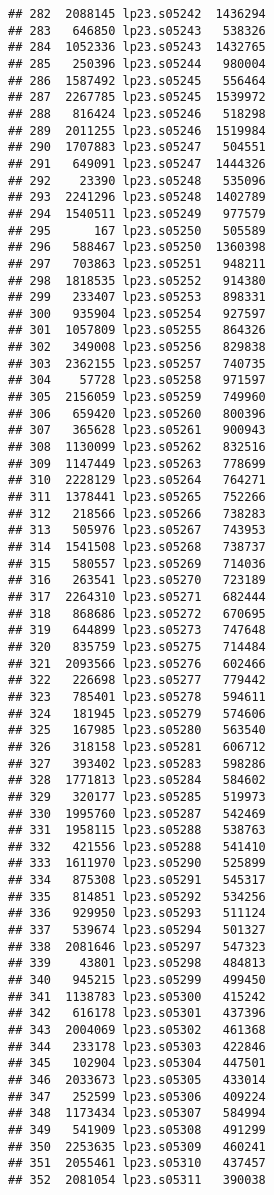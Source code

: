 \documentclass[
]{article}
\begin{document}
\begin{verbatim}
## 282  2088145 lp23.s05242  1436294
## 283   646850 lp23.s05243   538326
## 284  1052336 lp23.s05243  1432765
## 285   250396 lp23.s05244   980004
## 286  1587492 lp23.s05245   556464
## 287  2267785 lp23.s05245  1539972
## 288   816424 lp23.s05246   518298
## 289  2011255 lp23.s05246  1519984
## 290  1707883 lp23.s05247   504551
## 291   649091 lp23.s05247  1444326
## 292    23390 lp23.s05248   535096
## 293  2241296 lp23.s05248  1402789
## 294  1540511 lp23.s05249   977579
## 295      167 lp23.s05250   505589
## 296   588467 lp23.s05250  1360398
## 297   703863 lp23.s05251   948211
## 298  1818535 lp23.s05252   914380
## 299   233407 lp23.s05253   898331
## 300   935904 lp23.s05254   927597
## 301  1057809 lp23.s05255   864326
## 302   349008 lp23.s05256   829838
## 303  2362155 lp23.s05257   740735
## 304    57728 lp23.s05258   971597
## 305  2156059 lp23.s05259   749960
## 306   659420 lp23.s05260   800396
## 307   365628 lp23.s05261   900943
## 308  1130099 lp23.s05262   832516
## 309  1147449 lp23.s05263   778699
## 310  2228129 lp23.s05264   764271
## 311  1378441 lp23.s05265   752266
## 312   218566 lp23.s05266   738283
## 313   505976 lp23.s05267   743953
## 314  1541508 lp23.s05268   738737
## 315   580557 lp23.s05269   714036
## 316   263541 lp23.s05270   723189
## 317  2264310 lp23.s05271   682444
## 318   868686 lp23.s05272   670695
## 319   644899 lp23.s05273   747648
## 320   835759 lp23.s05275   714484
## 321  2093566 lp23.s05276   602466
## 322   226698 lp23.s05277   779442
## 323   785401 lp23.s05278   594611
## 324   181945 lp23.s05279   574606
## 325   167985 lp23.s05280   563540
## 326   318158 lp23.s05281   606712
## 327   393402 lp23.s05283   598286
## 328  1771813 lp23.s05284   584602
## 329   320177 lp23.s05285   519973
## 330  1995760 lp23.s05287   542469
## 331  1958115 lp23.s05288   538763
## 332   421556 lp23.s05288   541410
## 333  1611970 lp23.s05290   525899
## 334   875308 lp23.s05291   545317
## 335   814851 lp23.s05292   534256
## 336   929950 lp23.s05293   511124
## 337   539674 lp23.s05294   501327
## 338  2081646 lp23.s05297   547323
## 339    43801 lp23.s05298   484813
## 340   945215 lp23.s05299   499450
## 341  1138783 lp23.s05300   415242
## 342   616178 lp23.s05301   437396
## 343  2004069 lp23.s05302   461368
## 344   233178 lp23.s05303   422846
## 345   102904 lp23.s05304   447501
## 346  2033673 lp23.s05305   433014
## 347   252599 lp23.s05306   409224
## 348  1173434 lp23.s05307   584994
## 349   541909 lp23.s05308   491299
## 350  2253635 lp23.s05309   460241
## 351  2055461 lp23.s05310   437457
## 352  2081054 lp23.s05311   390038

\end{verbatim}
\end{document}
